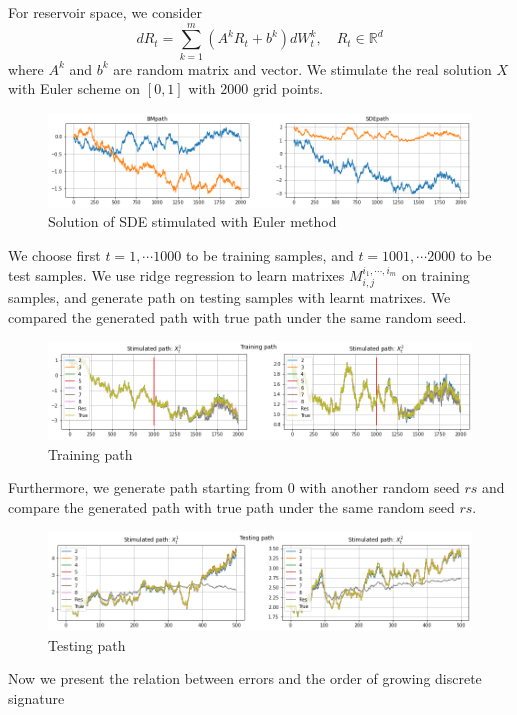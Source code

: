 \documentclass[12pt]{report}
\theoremstyle{definition}
\theoremstyle{remark}
\newcommand{\R}{\mathbb{R}}
\begin{document}
For reservoir space, we consider 
\begin{equation}
  dR_{t} = \sum_{k=1}^{m}(A^{k}R_{t} + b^{k})dW^{k}_{t},\quad R_{t}\in\R^{d}
\end{equation}
where $A^{k}$ and $b^{k}$ are random matrix and vector. We stimulate the real solution $X$ with Euler scheme on $[0,1]$ with $2000$ grid points. 
\begin{figure}[H]
    \centering
    \includegraphics[width=\textwidth]{figs/res1.png}
    \caption{Solution of SDE stimulated with Euler method}
\end{figure}
We choose first $t=1,\cdots 1000$ to be training samples, and $t=1001,\cdots 2000$ to be test samples. We use ridge regression to learn matrixes $M^{i_{1},\cdots,i_{m}}_{i,j}$ on training samples, and generate path on testing samples with learnt matrixes. We compared the generated path with true path under the same random seed. 
\begin{figure}[H]
    \centering
    \includegraphics[width=\textwidth]{figs/res2.png}
    \caption{Training path}
\end{figure}
Furthermore, we generate path starting from $0$ with another random seed $rs$ and compare the generated path with true path under the same random seed $rs$. 
\begin{figure}[H]
    \centering
    \includegraphics[width=\textwidth]{figs/res3.png}
    \caption{Testing path}
\end{figure}
Now we present the relation between errors and the order of growing discrete signature 
\end{document}
